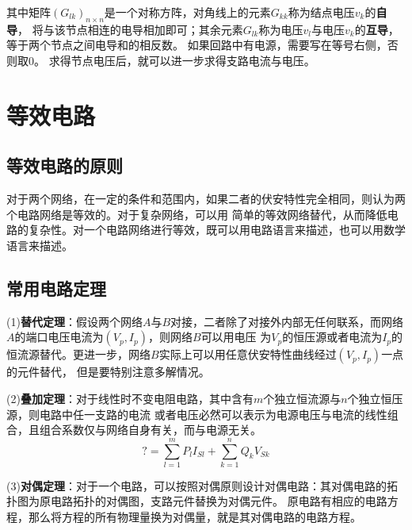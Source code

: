     其中矩阵$(G_{lk})_{n\times n}$是一个对称方阵，对角线上的元素$G_{kk}$称为结点电压$v_k$的\textbf{自导}，
    将与该节点相连的电导相加即可；其余元素$G_{lk}$称为电压$v_l$与电压$v_k$的\textbf{互导}，等于两个节点之间电导和的相反数。
    如果回路中有电源，需要写在等号右侧，否则取0。
    求得节点电压后，就可以进一步求得支路电流与电压。

    \section{等效电路}
    \subsection{等效电路的原则}
    \par 对于两个网络，在一定的条件和范围内，如果二者的伏安特性完全相同，则认为两个电路网络是等效的。对于复杂网络，可以用
    简单的等效网络替代，从而降低电路的复杂性。对一个电路网络进行等效，既可以用电路语言来描述，也可以用数学语言来描述。
    \subsection{常用电路定理}
    \par (1)\textbf{替代定理}：假设两个网络$A$与$B$对接，二者除了对接外内部无任何联系，而网络$A$的端口电压电流为$(V_p,I_p)$，则网络$B$可以用电压
    为$V_p$的恒压源或者电流为$I_p$的恒流源替代。更进一步，网络$B$实际上可以用任意伏安特性曲线经过$(V_p,I_p)$一点的元件替代，
    但是要特别注意多解情况。
    \par (2)\textbf{叠加定理}：对于线性时不变电阻电路，其中含有$m$个独立恒流源与$n$个独立恒压源，则电路中任一支路的电流
    或者电压必然可以表示为电源电压与电流的线性组合，且组合系数仅与网络自身有关，而与电源无关。
    \[
    ?=\sum_{l=1}^{m}P_lI_{Sl}+\sum_{k=1}^{n}Q_kV_{Sk}    
    \]
    \par (3)\textbf{对偶定理}：对于一个电路，可以按照对偶原则设计对偶电路：其对偶电路的拓扑图为原电路拓扑的对偶图，支路元件替换为对偶元件。
    原电路有相应的电路方程，那么将方程的所有物理量换为对偶量，就是其对偶电路的电路方程。
    
